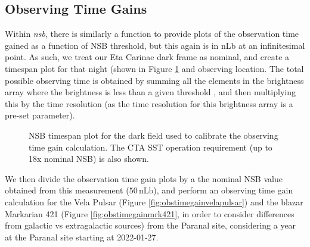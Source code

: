 \subsection{Observing Time Gains}
Within \textit{nsb}, there is similarly a function to provide plots of the observation time gained as a function of NSB threshold, but this again is in nLb at an infinitesimal point. As such, we treat our Eta Carinae dark frame as nominal, and create a timespan plot for that night (shown in Figure \ref{fig:timespan_dark} and observing location. The total possible observing time is obtained by summing all the elements in the brightness array where the brightness is less than a given threshold , and then multiplying this by the time resolution (as the time resolution for this brightness array is a pre-set parameter).
\begin{figure}[ht]
\begin{centering}
\caption{NSB timespan plot for the dark field used to calibrate the observing time gain calculation. The CTA SST operation requirement (up to 18x nominal NSB) is also shown.}
\label{fig:timespan_dark}
\end{centering}
\end{figure}

We then divide the observation time gain plots by a the nominal NSB value obtained from this measurement ($\mathrm{50\,nLb}$), and perform an observing time gain calculation for the Vela Pulsar (Figure \ref{fig:obstimegainvelapulsar}) and the blazar Markarian 421 (Figure \ref{fig:obstimegainmrk421}, in order to consider differences from galactic vs extragalactic sources) from the Paranal site, considering a year at the Paranal site starting at 2022-01-27.

